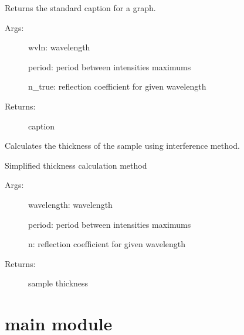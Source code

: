 \documentclass[letterpaper,10pt,english]{sphinxmanual}
\begin{document}

\begin{fulllineitems}
\label{\detokenize{GUI:GUI.textstr}}
Returns the standard caption for a graph.
\begin{description}
\item[{Args:}] \leavevmode
wvln: wavelength

period: period between intensities maximums

n\_true: reflection coefficient for given wavelength

\item[{Returns:}] \leavevmode
caption

\end{description}

\end{fulllineitems}


\begin{fulllineitems}
\label{\detokenize{GUI:GUI.thickness}}
Calculates the thickness of the sample using interference method.

Simplified thickness calculation method
\begin{description}
\item[{Args:}] \leavevmode
wavelength: wavelength

period: period between intensities maximums

n: reflection coefficient for given wavelength

\item[{Returns:}] \leavevmode
sample thickness

\end{description}

\end{fulllineitems}



\section{main module}
\label{\detokenize{main:module-main}}\label{\detokenize{main:main-module}}\label{\detokenize{main::doc}}
\end{document}
